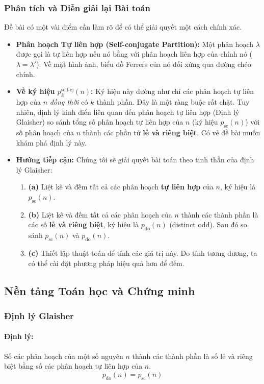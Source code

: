 \documentclass[a4paper,12pt]{article}
\begin{document}
\subsubsection{Phân tích và Diễn giải lại Bài toán}
Đề bài có một vài điểm cần làm rõ để có thể giải quyết một cách chính xác.
\begin{itemize}
    \item \textbf{Phân hoạch Tự liên hợp (Self-conjugate Partition):} Một phân hoạch $\lambda$ được gọi là tự liên hợp nếu nó bằng với phân hoạch liên hợp của chính nó ($\lambda = \lambda'$). Về mặt hình ảnh, biểu đồ Ferrers của nó đối xứng qua đường chéo chính.
    \item \textbf{Về ký hiệu $p_k^{\text{self-cj}}(n)$:} Ký hiệu này dường như chỉ các phân hoạch tự liên hợp của $n$ \textit{đồng thời} có $k$ thành phần. Đây là một ràng buộc rất chặt. Tuy nhiên, định lý kinh điển liên quan đến phân hoạch tự liên hợp (Định lý Glaisher) so sánh tổng số phân hoạch tự liên hợp của $n$ (ký hiệu $p_{\text{sc}}(n)$) với số phân hoạch của $n$ thành các phần tử \textbf{lẻ và riêng biệt}. Có vẻ đề bài muốn khám phá định lý này.
    \item \textbf{Hướng tiếp cận:} Chúng tôi sẽ giải quyết bài toán theo tinh thần của định lý Glaisher:
    \begin{enumerate}
        \item \textbf{(a)} Liệt kê và đếm tất cả các phân hoạch \textbf{tự liên hợp} của $n$, ký hiệu là $p_{\text{sc}}(n)$.
        \item \textbf{(b)} Liệt kê và đếm tất cả các phân hoạch của $n$ thành các thành phần là các số \textbf{lẻ và riêng biệt}, ký hiệu là $p_{\text{do}}(n)$ (distinct odd). Sau đó so sánh $p_{\text{sc}}(n)$ và $p_{\text{do}}(n)$.
        \item \textbf{(c)} Thiết lập thuật toán để tính các giá trị này. Do tính tương đương, ta có thể cài đặt phương pháp hiệu quả hơn để đếm.
    \end{enumerate}
\end{itemize}

\subsection{Nền tảng Toán học và Chứng minh}

\subsubsection{Định lý Glaisher}
\paragraph{Định lý:} Số các phân hoạch của một số nguyên $n$ thành các thành phần là số lẻ và riêng biệt bằng số các phân hoạch tự liên hợp của $n$.
\[ p_{\text{do}}(n) = p_{\text{sc}}(n) \]
\end{document}

